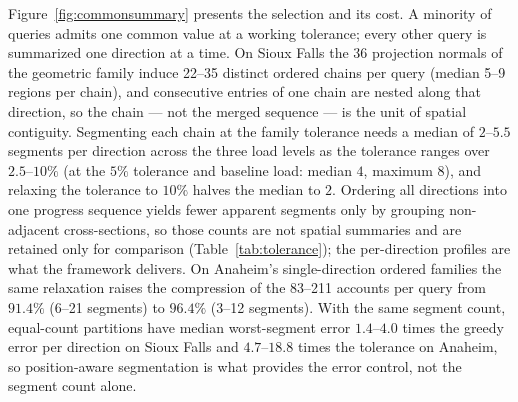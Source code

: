 Figure~\ref{fig:commonsummary} presents the selection and its cost. A
minority of queries admits one common value at a working tolerance;
every other query is summarized one direction at a time. On Sioux
Falls the 36 projection normals of the geometric family induce
22--35 distinct ordered chains per query (median 5--9 regions per
chain), and consecutive entries of one chain are nested along that
direction, so the chain --- not the merged sequence --- is the unit of
spatial contiguity. Segmenting each chain at the family tolerance
needs a median of $2$--$5.5$ segments per direction across the three
load levels as the tolerance ranges over $2.5$--$10\%$ (at the $5\%$
tolerance and baseline load: median $4$, maximum $8$), and relaxing
the tolerance to $10\%$ halves the median to $2$. Ordering all
directions into one progress sequence yields fewer apparent segments
only by grouping non-adjacent cross-sections, so those counts are not
spatial summaries and are retained only for comparison
(Table~\ref{tab:tolerance}); the per-direction profiles are what the
framework delivers. On Anaheim's single-direction ordered families
the same relaxation raises the compression of the 83--211 accounts
per query from $91.4\%$ (6--21 segments) to $96.4\%$ (3--12
segments). With the same segment count, equal-count partitions have
median worst-segment error $1.4$--$4.0$ times the greedy error per
direction on Sioux Falls and $4.7$--$18.8$ times the tolerance on
Anaheim, so position-aware segmentation is what provides the error
control, not the segment count alone.

